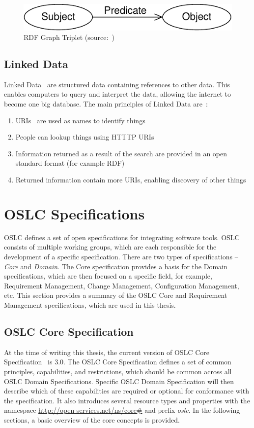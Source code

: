 \begin{figure}[hbt]
  \centering
  \includegraphics[width=.6 \linewidth]{figures/rdf-graph.pdf}
  \caption{RDF Graph Triplet (source: \cite{rdf_primer})}
  \label{fig:rdf_graph_triplet}
\end{figure}

\subsection*{Linked Data}
Linked Data \cite{linked_data} are structured data containing references to other data. This enables computers to query and interpret the data, allowing the internet to become one big database. The main principles of Linked Data are \cite{linked_data_design_issues}:
\begin{enumerate}
  \item URIs \cite{uri_rfc} are used as names to identify things
  \item People can lookup things using HTTTP URIs
  \item Information returned as a result of the search are provided in an open standard format (for example RDF)
  \item Returned information contain more URIs, enabling discovery of other things
\end{enumerate}

\section{OSLC Specifications}
OSLC defines a set of open specifications for integrating software tools. OSLC consists of multiple working groups, which are each responsible for the development of a specific specification. There are two types of specifications -- \emph{Core} and \emph{Domain}. The Core specification provides a basis for the Domain specifications, which are then focused on a specific field, for example, Requirement Management, Change Management, Configuration Management, etc. This section provides a summary of the OSLC Core and Requirement Management specifications, which are used in this thesis.

\subsection{OSLC Core Specification}
At the time of writing this thesis, the current version of OSLC Core Specification \cite{oslc_core_specification} is 3.0. The OSLC Core Specification defines a set of common principles, capabilities, and restrictions, which should be common across all OSLC Domain Specifications. Specific OSLC Domain Specification will then describe which of these capabilities are required or optional for conformance with the specification. It also introduces several resource types and properties with the namespace \url{http://open-services.net/ns/core\#} and prefix \emph{oslc}. In the following sections, a basic overview of the core concepts is provided.


